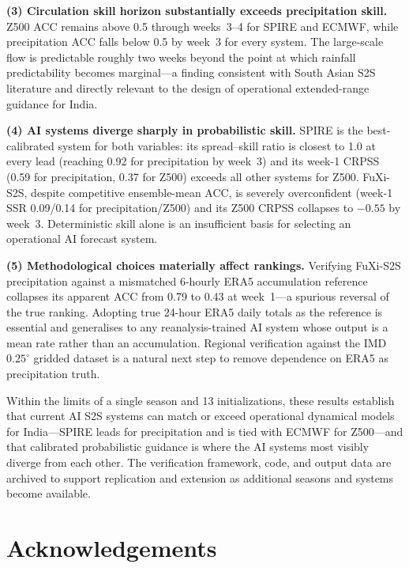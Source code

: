 \documentclass[11pt]{article}
\begin{document}
\textbf{(3) Circulation skill horizon substantially exceeds precipitation
skill.}
Z500 ACC remains above 0.5 through weeks~3--4 for SPIRE and ECMWF,
while precipitation ACC falls below 0.5 by week~3 for every system. The
large-scale flow is predictable roughly two weeks beyond the point at
which rainfall predictability becomes marginal---a finding consistent
with South Asian S2S literature \citep{deandrade2019,white2017} and
directly relevant to the design of operational extended-range guidance
for India.

\textbf{(4) AI systems diverge sharply in probabilistic skill.}
SPIRE is the best-calibrated system for both variables: its
spread--skill ratio is closest to 1.0 at every lead (reaching 0.92 for
precipitation by week~3) and its week-1 CRPSS (0.59 for precipitation,
0.37 for Z500) exceeds all other systems for Z500. FuXi-S2S, despite
competitive ensemble-mean ACC, is severely overconfident (week-1 SSR
0.09/0.14 for precipitation/Z500) and its Z500 CRPSS collapses to
$-0.55$ by week~3. Deterministic skill alone is an insufficient basis
for selecting an operational AI forecast system.

\textbf{(5) Methodological choices materially affect rankings.}
Verifying FuXi-S2S precipitation against a mismatched 6-hourly ERA5
accumulation reference collapses its apparent ACC from 0.79 to 0.43 at
week~1---a spurious reversal of the true ranking. Adopting true 24-hour
ERA5 daily totals as the reference is essential and generalises to any
reanalysis-trained AI system whose output is a mean rate rather than an
accumulation. Regional verification against the IMD $0.25^\circ$ gridded
dataset \citep{pai2014} is a natural next step to remove dependence on
ERA5 as precipitation truth.

Within the limits of a single season and 13 initializations, these
results establish that current AI S2S systems can match or exceed
operational dynamical models for India---SPIRE leads for precipitation
and is tied with ECMWF for Z500---and that calibrated probabilistic
guidance is where the AI systems most visibly diverge from each other.
The verification framework, code, and output data are archived to
support replication and extension as additional seasons and systems
become available.

\section*{Acknowledgements}
\end{document}
